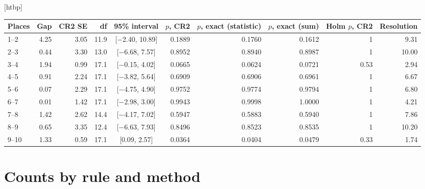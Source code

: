 \documentclass{article}
\makeatletter
\renewenvironment{table}
  {\setlength{\abovecaptionskip}{6\p@}%
   \setlength{\belowcaptionskip}{\z@}%
   \@float{table}}
  {\end@float}
\makeatother
\begin{document}
\begin{table}[htbp]
\centering
\scriptsize
\setlength{\tabcolsep}{3.5pt}
\begin{tabular}{@{}lrrrcrrrrr@{}}
\toprule
Places & Gap & CR2 SE & df & 95\% interval & $p$, CR2 & $p$, exact (statistic) & $p$, exact (sum) & Holm $p$, CR2 & Resolution \\
\midrule
1--2  & 4.25 & 3.05 & 11.9 & [$-$2.40, 10.89] & 0.1889 & 0.1760 & 0.1612 & 1    & 9.31 \\
2--3  & 0.44 & 3.30 & 13.0 & [$-$6.68, \phantom{1}7.57] & 0.8952 & 0.8940 & 0.8987 & 1    & 10.00 \\
3--4  & 1.94 & 0.99 & 17.1 & [$-$0.15, \phantom{1}4.02] & 0.0665 & 0.0624 & 0.0721 & 0.53 & 2.94 \\
4--5  & 0.91 & 2.24 & 17.1 & [$-$3.82, \phantom{1}5.64] & 0.6909 & 0.6906 & 0.6961 & 1    & 6.67 \\
5--6  & 0.07 & 2.29 & 17.1 & [$-$4.75, \phantom{1}4.90] & 0.9752 & 0.9774 & 0.9794 & 1    & 6.80 \\
6--7  & 0.01 & 1.42 & 17.1 & [$-$2.98, \phantom{1}3.00] & 0.9943 & 0.9998 & 1.0000 & 1    & 4.21 \\
7--8  & 1.42 & 2.62 & 14.4 & [$-$4.17, \phantom{1}7.02] & 0.5947 & 0.5883 & 0.5940 & 1    & 7.86 \\
8--9  & 0.65 & 3.35 & 12.4 & [$-$6.63, \phantom{1}7.93] & 0.8496 & 0.8523 & 0.8535 & 1    & 10.20 \\
9--10 & 1.33 & 0.59 & 17.1 & [\phantom{$-$}0.09, \phantom{1}2.57] & 0.0364 & 0.0404 & 0.0479 & 0.33 & 1.74 \\
\bottomrule
\end{tabular}
\caption{The nine neighbouring pairs of GIFT-Eval's displayed top ten under mean rank on MASE,
with CR2. The gap is the lower-placed entry's mean rank minus the higher-placed entry's, in
rank places, so a positive gap favours the higher-placed entry. The first exact test uses the
wild cluster bootstrap's statistic, the mean over its clustered standard error. The second
uses the plain sum. The Holm $p$-value is corrected over the nine pairs. The resolution of a
pair is $(t_{0.975}+t_{0.80})$ times its CR2 standard error at its own degrees of freedom.
The median of the nine, 6.80, is the board's resolution.}
\label{tab:adjacent}
\end{table}


\section{Counts by rule and method}
\label{app:counts}
\end{document}
